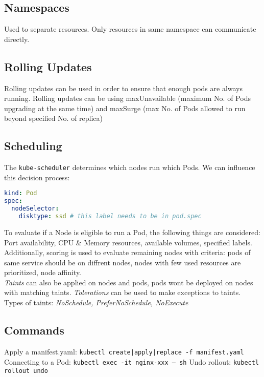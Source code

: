 \subsection{Namespaces}
Used to separate resources. Only resources in same namespace can communicate directly.


\subsection{Rolling Updates}
Rolling updates can be used in order to ensure that enough pods are always running.
Rolling updates can be using maxUnavailable (maximum No. of Pods upgrading at the same time) and maxSurge (max No. of Pods allowed to run beyond specified No. of replica)

\subsection{Scheduling}
The \texttt{kube-scheduler} determines which nodes run which Pods. We can influence this decision process:

\begin{lstlisting}[language=yaml]
kind: Pod
spec:
  nodeSelector:
    disktype: ssd # this label needs to be in pod.spec
\end{lstlisting}

To evaluate if a Node is eligible to run a Pod, the following things are considered: Port availability, CPU \& Memory resources, available volumes, specified labels. Additionally, scoring is used to evaluate remaining nodes with criteria: pods of same service should be on diffrent nodes, nodes with few used resources are prioritized, node affinity. \\
\textit{Taints} can also be applied on nodes and pods, pods wont be deployed on nodes with matching taints. \textit{Tolerations} can be used to make exceptions to taints. Types of taints: \textit{NoSchedule, PreferNoSchedule, NoExecute}


\subsection{Commands}
Apply a manifest.yaml: \texttt{kubectl {create|apply|replace} -f manifest.yaml} \\
Connecting to a Pod: \texttt{kubectl exec -it nginx-xxx -- sh}
Undo rollout: \texttt{kubectl rollout undo}
